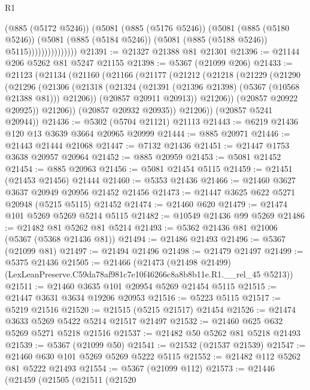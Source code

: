 \begin{lexlean}{R1}
\begin{coremodule}
                          (@885 (@5172 @5246))
                          (@5081
                            (@885 (@5176 @5246))
                            (@5081
                              (@885 (@5180 @5246))
                              (@5081
                                (@885 (@5184 @5246))
                                (@5081 (@885 (@5188 @5246)) @5115)))))))))))))))
@21391 := @21327 @21388 @81 @21301
@21396 := @21144 @206 @5262 @81 @5247 @21155
@21398 := @5367 (@21099 @206)
@21433 := @21123
    (@21134
      (@21160
        (@21166
          (@21177
            (@21212
              (@21218
                (@21229
                  (@21290
                    (@21296
                      (@21306
                        (@21318
                          (@21324 (@21391 (@21396 @21398) (@5367 (@10568 @21388 @81))) @21206))
                        (@20857 @20911 @20913))
                      @21206))
                  (@20857 @20922 @20925))
                @21206))
            (@20857 @20932 @20935))
          @21206))
      (@20857 @5241 @20944))
@21436 := @5302 (@5704 @21121) @21113
@21443 := @6219 @21436 @120 @13 @3639 @3664 @20965 @20999
@21444 := @885 @20971
@21446 := @21443 @21444 @21068
@21447 := @7132 @21436
@21451 := @21447 @1753 @3638 @20957 @20964
@21452 := @885 @20959
@21453 := @5081 @21452
@21454 := @885 @20963
@21456 := @5081 @21454 @5115
@21459 := @21451 (@21453 @21456) @21444
@21460 := @5353 @21436
@21466 := @21460 @3627 @3637 @20949 @20956 @21452 @21456
@21473 := @21447 @3625 @622 @5271 @20948 (@5215 @5115) @21452
@21474 := @21460 @620
@21479 := @21474 @101 @5269 @5269 @5214 @5115
@21482 := @10549 @21436 @99 @5269
@21486 := @21482 @81 @5262 @81 @5214
@21493 := @5362 @21436 @81 @21006 (@5367 (@5368 @21436 @81))
@21494 := @21486 @21493
@21496 := @5367 (@21099 @81)
@21497 := @21494 @21496
@21498 := @21479 @21497
@21499 := @5375 @21436
@21505 := @21466
    (@21473 (@21498 @21499) (LexLeanPreserve.C59da78af981c7e10f46266c8a8b8b11e.R1.__rel_45 @5213))
@21511 := @21460 @3635 @101 @20954 @5269 @21454 @5115
@21515 := @21447 @3631 @3634 @19206 @20953
@21516 := @5223 @5115
@21517 := @5219 @21516
@21520 := @21515 (@5215 @21517) @21454
@21526 := @21474 @3633 @5269 @5422 @5214 @21517 @21497
@21532 := @21460 @625 @632 @5269 @5271 @5218 @21516
@21537 := @21482 @50 @5262 @81 @5218 @21493
@21539 := @5367 (@21099 @50)
@21541 := @21532 (@21537 @21539)
@21547 := @21460 @630 @101 @5269 @5269 @5222 @5115
@21552 := @21482 @112 @5262 @81 @5222 @21493
@21554 := @5367 (@21099 @112)
@21573 := @21446
    (@21459
      (@21505
        (@21511
          (@21520

\end{coremodule}
\end{lexlean}
